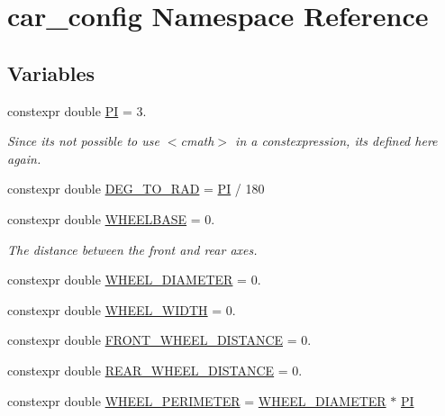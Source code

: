 \hypertarget{namespacecar__config}{}\section{car\+\_\+config Namespace Reference}
\label{namespacecar__config}
\subsection*{Variables}
\begin{DoxyCompactItemize}
\item 
constexpr double \hyperlink{namespacecar__config_a90cb9957197db8924811c447bc98703a}{PI} = 3.
\begin{DoxyCompactList}\small\item\em Since it\textquotesingle{}s not possible to use $<$cmath$>$ in a constexpression, it\textquotesingle{}s defined here again. \end{DoxyCompactList}\item 
constexpr double \hyperlink{namespacecar__config_a72deaa1a555d694e52fb768ffba1d8cb}{D\+E\+G\+\_\+\+T\+O\+\_\+\+R\+AD} = \hyperlink{namespacecar__config_a90cb9957197db8924811c447bc98703a}{PI} / 180
\item 
constexpr double \hyperlink{namespacecar__config_a4e9e4925d43a88de91b13bedafabce67}{W\+H\+E\+E\+L\+B\+A\+SE} = 0.
\begin{DoxyCompactList}\small\item\em The distance between the front and rear axes. \end{DoxyCompactList}\item 
constexpr double \hyperlink{namespacecar__config_a6f064e331d6d85d46028dfbe75f063dd}{W\+H\+E\+E\+L\+\_\+\+D\+I\+A\+M\+E\+T\+ER} = 0.
\item 
constexpr double \hyperlink{namespacecar__config_ace29186cd9605cde6edd0fd9b814df63}{W\+H\+E\+E\+L\+\_\+\+W\+I\+D\+TH} = 0.
\item 
constexpr double \hyperlink{namespacecar__config_a80d9d6f97a63ffcaba87b65a9e1e29e4}{F\+R\+O\+N\+T\+\_\+\+W\+H\+E\+E\+L\+\_\+\+D\+I\+S\+T\+A\+N\+CE} = 0.
\item 
constexpr double \hyperlink{namespacecar__config_a43e668702c6dc662ff95f80047ee5500}{R\+E\+A\+R\+\_\+\+W\+H\+E\+E\+L\+\_\+\+D\+I\+S\+T\+A\+N\+CE} = 0.
\item 
constexpr double \hyperlink{namespacecar__config_a46fe00906da07d2e030b586a634cd907}{W\+H\+E\+E\+L\+\_\+\+P\+E\+R\+I\+M\+E\+T\+ER} = \hyperlink{namespacecar__config_a6f064e331d6d85d46028dfbe75f063dd}{W\+H\+E\+E\+L\+\_\+\+D\+I\+A\+M\+E\+T\+ER} $\ast$ \hyperlink{namespacecar__config_a90cb9957197db8924811c447bc98703a}{PI}

\end{DoxyCompactItemize}
